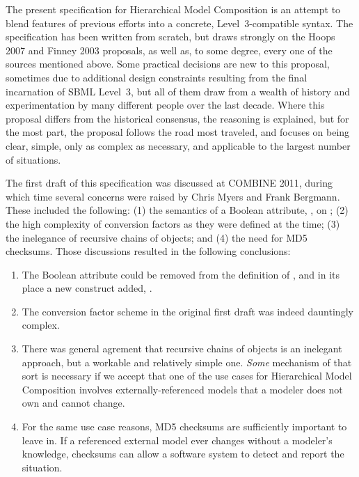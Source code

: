 The present specification for Hierarchical Model Composition is an attempt to blend features of previous efforts into a concrete, Level~3-compatible syntax.  The specification has been written from scratch, but draws strongly on the Hoops 2007 and Finney 2003 proposals, as well as, to some degree, every one of the sources mentioned above. Some practical decisions are new to this proposal, sometimes due to additional design constraints resulting from the final incarnation of SBML Level~3, but all of them draw from a wealth of history and experimentation by many different people over the last decade.  Where this proposal differs from the historical consensus, the reasoning is explained, but for the most part, the proposal follows the road most traveled, and focuses on being clear, simple, only as complex as necessary, and applicable to the largest number of situations.

The first draft of this specification was discussed at COMBINE 2011, during which time several concerns were raised by Chris Myers and Frank Bergmann.  These included the following: (1) the semantics of a Boolean attribute, , on \ReplacedElement; (2) the high complexity of conversion factors as they were defined at the time; (3) the inelegance of recursive chains of \SBaseRef objects; and (4) the need for MD5 checksums.  Those discussions resulted in the following conclusions:

\begin{enumerate}

\item The Boolean attribute  could be removed from the definition of \ReplacedElement, and in its place a new construct added, \ReplacedBy.

\item The conversion factor scheme in the original first draft was indeed dauntingly complex.

\item There was general agrement that recursive chains of \SBaseRef objects is an inelegant approach, but a workable and relatively simple one.  \emph{Some} mechanism of that sort is necessary if we accept that one of the use cases for Hierarchical Model Composition involves externally-referenced models that a modeler does not own and cannot change.

\item For the same use case reasons, MD5 checksums are sufficiently important to leave in.  If a referenced external model ever changes without a modeler's knowledge, checksums can allow a software system to detect and report the situation.

\end{enumerate}

